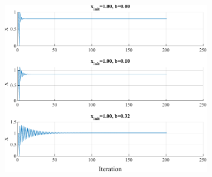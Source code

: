 \begin{figure}[htpb]
\begin{subfigure}{0.47\textwidth}
		\includegraphics[width=\textwidth]{../Problem 3/prob3_(b)_x_init_1.00.pdf}
		\caption{}
	\end{subfigure}
	\caption{}
	\label{fig:prob3_multiple_x_multiple_b}
\end{figure}